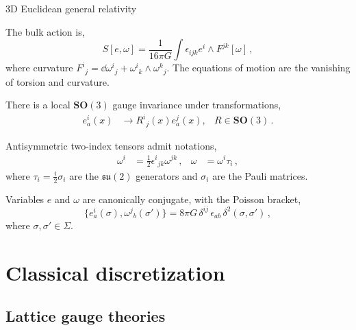 \documentclass[12pt,titlepage]{article}
\begin{document}
\begin{frame}{3D Euclidean general relativity}
    \begin{list}{\,}{\leftmargin=1em \itemindent=0em}
        \item<1-> The bulk action is,
        \begin{equation}
            S[e,\omega]=\frac{1}{16\pi G}\int \epsilon_{ijk}e^i \wedge F^{jk}[\omega]\,,
        \end{equation}
        where curvature ${F^i}_j=\dd{{\omega^i}_j}+{\omega^i}_k \wedge {\omega^k}_j$. The equations of motion are the vanishing of torsion and curvature.
        \item<2-> There is a local $\mathbf{SO}(3)$ gauge invariance under transformations,
        \begin{align}
            e^i_a(x)&\to {R^i}_j(x)e^j_a(x), &R\in\mathbf{SO}(3)\,.
        \end{align}
        \item<3-> Antisymmetric two-index tensors admit notations,
        \begin{align}
            \omega^i&=\frac{1}{2}{\epsilon^i}_{jk}\omega^{jk}\,, &\omega&=\omega^i\tau_i\,, 
        \end{align}
        where $\tau_i=\frac{i}{2}\sigma_i$ are the $\mathfrak{su}(2)$ generators and $\sigma_i$ are the Pauli matrices.
        \item<4-> Variables $e$ and $\omega$ are canonically conjugate, with the Poisson bracket,
        \begin{equation}
            \{e^i_a(\sigma),{\omega^j}_b(\sigma')\}=8\pi G\,\delta^{ij}\,\epsilon_{ab}\, \delta^2(\sigma,\sigma')\,,
        \end{equation}
        where $\sigma,\sigma'\in\Sigma$.
    \end{list}
\end{frame}

\section{Classical discretization}

\subsection{Lattice gauge theories}
\end{document}
